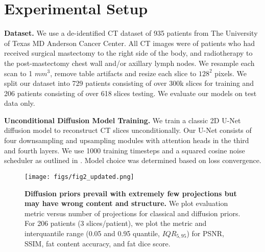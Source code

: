 \section{Experimental Setup}
\textbf{Dataset. } We use a de-identified CT dataset of 935 patients from The University of Texas MD Anderson Cancer Center.
All CT images were of patients who had received surgical mastectomy to the right side of the body, and radiotherapy to the post-mastectomy chest wall and/or axillary lymph nodes. We resample each scan to 1 $mm^3$, remove table artifacts and resize each slice to $128^2$ pixels. We split our dataset into 729 patients consisting of over 300k slices for training and 206 patients consisting of over 618 slices testing. We evaluate our models on test data only.

\noindent\textbf{Unconditional Diffusion Model Training. } We train a classic 2D U-Net diffusion model to reconstruct CT slices unconditionally. Our U-Net consists of four downsampling and upsampling modules with attention heads in the third and fourth layers. We use 1000 training timesteps and a squared cosine noise scheduler as outlined in \cite{ho2020denoising}. 
Model choice was determined based on loss convergence.

\begin{figure*}[!t]
    \centering
    \texttt{[image: figs/fig2\_updated.png]}
    \caption{\textbf{Diffusion priors prevail with extremely few projections but may have wrong content and structure. } We plot evaluation metric versus number of projections for classical and diffusion priors. For 206 patients (3 slices/patient), we plot the metric and interquantile range (0.05 and 0.95 quantile, $IQR_{5,95}$) for PSNR, SSIM, fat content accuracy, and fat dice score.}
    \label{fig:trend}
\end{figure*}


